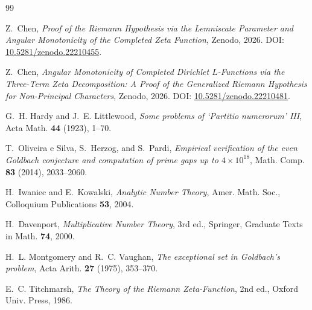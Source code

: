 \documentclass[11pt,a4paper]{article}
\theoremstyle{remark}
\begin{document}
\begin{thebibliography}{99}

Z.~Chen,
\emph{Proof of the Riemann Hypothesis via the Lemniscate Parameter
and Angular Monotonicity of the Completed Zeta Function},
Zenodo, 2026.  DOI: \href{https://doi.org/10.5281/zenodo.22210455}{10.5281/zenodo.22210455}.

Z.~Chen,
\emph{Angular Monotonicity of Completed Dirichlet $L$-Functions via the
Three-Term Zeta Decomposition: A Proof of the Generalized Riemann
Hypothesis for Non-Principal Characters},
Zenodo, 2026.  DOI: \href{https://doi.org/10.5281/zenodo.22210481}{10.5281/zenodo.22210481}.

G.~H. Hardy and J.~E. Littlewood,
\emph{Some problems of `Partitio numerorum' III},
Acta Math. \textbf{44} (1923), 1--70.

T.~Oliveira e Silva, S.~Herzog, and S.~Pardi,
\emph{Empirical verification of the even Goldbach conjecture and
computation of prime gaps up to $4\times 10^{18}$},
Math. Comp. \textbf{83} (2014), 2033--2060.

H.~Iwaniec and E.~Kowalski,
\emph{Analytic Number Theory},
Amer. Math. Soc., Colloquium Publications \textbf{53}, 2004.

H.~Davenport,
\emph{Multiplicative Number Theory}, 3rd ed.,
Springer, Graduate Texts in Math. \textbf{74}, 2000.

H.~L. Montgomery and R.~C. Vaughan,
\emph{The exceptional set in Goldbach's problem},
Acta Arith. \textbf{27} (1975), 353--370.

E.~C. Titchmarsh,
\emph{The Theory of the Riemann Zeta-Function}, 2nd ed.,
Oxford Univ. Press, 1986.

\end{thebibliography}
\end{document}
